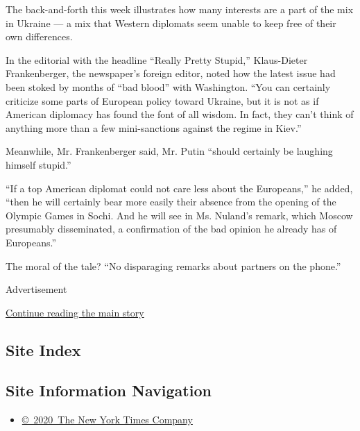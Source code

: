 The back-and-forth this week illustrates how many interests are a part
of the mix in Ukraine --- a mix that Western diplomats seem unable to
keep free of their own differences.

In the editorial with the headline ``Really Pretty Stupid,''
Klaus-Dieter Frankenberger, the newspaper's foreign editor, noted how
the latest issue had been stoked by months of ``bad blood'' with
Washington. ``You can certainly criticize some parts of European policy
toward Ukraine, but it is not as if American diplomacy has found the
font of all wisdom. In fact, they can't think of anything more than a
few mini-sanctions against the regime in Kiev.''

Meanwhile, Mr. Frankenberger said, Mr. Putin ``should certainly be
laughing himself stupid.''

``If a top American diplomat could not care less about the Europeans,''
he added, ``then he will certainly bear more easily their absence from
the opening of the Olympic Games in Sochi. And he will see in Ms.
Nuland's remark, which Moscow presumably disseminated, a confirmation of
the bad opinion he already has of Europeans.''

The moral of the tale? ``No disparaging remarks about partners on the
phone.''

Advertisement

\protect\hyperlink{after-bottom}{Continue reading the main story}

\hypertarget{site-index}{%
\subsection{Site Index}\label{site-index}}

\hypertarget{site-information-navigation}{%
\subsection{Site Information
Navigation}\label{site-information-navigation}}

\begin{itemize}
\tightlist
\item
  \href{https://help.nytimes.com/hc/en-us/articles/115014792127-Copyright-notice}{©~2020~The
  New York Times Company}
\end{itemize}

